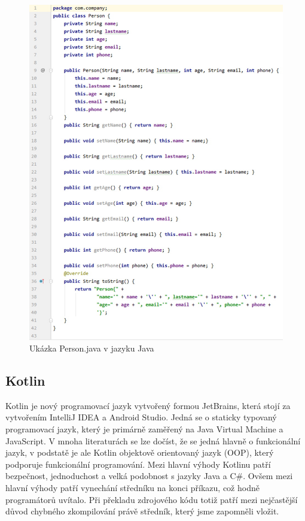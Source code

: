 \documentclass{vskpou} %
\begin{document}
 \begin{figure}[h!]
\centering
\includegraphics[scale=0.5]{images/10.jpg}
\caption{Ukázka Person.java v jazyku Java}
\label{10}
\end{figure}

\newpage
\subsection{Kotlin}
Kotlin je nový programovací jazyk vytvořený formou JetBrains, která stojí za vytvořením IntelliJ IDEA a Android Studio. Jedná se o staticky typovaný programovací jazyk, který je primárně zaměřený na Java Virtual Machine a JavaScript. V mnoha literaturách se lze dočíst, že se jedná hlavně o funkcionální jazyk, v podstatě je ale Kotlin objektově orientovaný jazyk (OOP), který podporuje funkcionální programování. Mezi hlavní výhody Kotlinu patří bezpečnost, jednoduchost a velká podobnost s jazyky Java a C\#. Ovšem mezi hlavní výhody patří vynechání středníku na konci příkazu, což hodně programátorů uvítalo. Při překladu zdrojového kódu totiž patří mezi nejčastější důvod chybného zkompilování právě středník, který jsme zapomněli vložit.\cite{6} 
\end{document}
